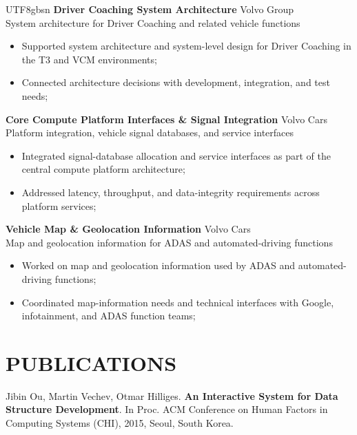 \documentclass[margin, 10pt]{res} %
\begin{document}
\begin{resume}
\begin{CJK}{UTF8}{gbsn}
\textbf{Driver Coaching System Architecture} \hfill Volvo Group \\
System architecture for Driver Coaching and related vehicle functions
\begin{itemize} \itemsep -2pt %
\item Supported system architecture and system-level design for Driver Coaching in the T3 and VCM environments;
\item Connected architecture decisions with development, integration, and test needs;
\end{itemize}

\textbf{Core Compute Platform Interfaces \& Signal Integration} \hfill Volvo Cars \\
Platform integration, vehicle signal databases, and service interfaces
\begin{itemize} \itemsep -2pt %
\item Integrated signal-database allocation and service interfaces as part of the central compute platform architecture;
\item Addressed latency, throughput, and data-integrity requirements across platform services;
\end{itemize}

\textbf{Vehicle Map \& Geolocation Information} \hfill Volvo Cars \\
Map and geolocation information for ADAS and automated-driving functions
\begin{itemize} \itemsep -2pt %
\item Worked on map and geolocation information used by ADAS and automated-driving functions;
\item Coordinated map-information needs and technical interfaces with Google, infotainment, and ADAS function teams;
\end{itemize}


\section{PUBLICATIONS}
Jibin Ou, Martin Vechev, Otmar Hilliges. \textbf{An Interactive System for Data Structure Development}.
In Proc. ACM Conference on Human Factors in Computing Systems (CHI), 2015, Seoul, South Korea.


\end{CJK}
\end{resume}
\end{document}
